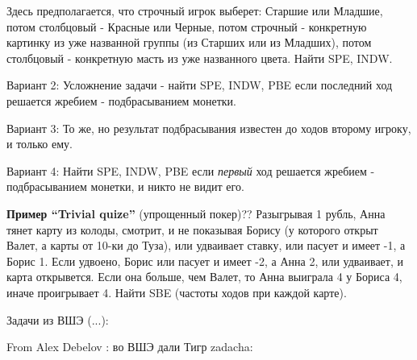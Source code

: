 \documentclass[a4paper,12pt]{article}
\begin{document}
Здесь предполагается, что строчный игрок выберет: Старшие
или Младшие, потом столбцовый - Красные или Черные, потом
строчный - конкретную картинку из уже названной группы (из
Старших или из Младших), потом столбцовый - конкретную
масть из уже названного цвета. Найти SPE, INDW.

Вариант 2: Усложнение задачи - найти SPE, INDW, PBE если
последний ход решается жребием - подбрасыванием монетки.

Вариант 3: То же, но результат подбрасывания известен до
ходов второму игроку, и только ему.

Вариант 4: Найти SPE, INDW, PBE если {\em первый} ход
решается жребием - подбрасыванием монетки, и никто не видит
его. \vspace{2mm}

{\bf Пример ``Trivial quize''} (упрощенный покер)?? Разыгрывая 1
рубль, Анна тянет карту из колоды, смотрит, и не показывая
Борису (у которого открыт Валет, а карты от 10-ки до Туза), или
удваивает ставку, или пасует и имеет -1, а Борис 1. Если
удвоено, Борис или пасует и имеет -2, а Анна 2, или удваивает, и
карта открывется. Если она больше, чем Валет, то Анна выиграла 4
у Бориса 4, иначе проигрывает 4. Найти SBE (частоты ходов при
каждой карте).

{\Large Задачи из ВШЭ} (...):

 From Alex
Debelov : во ВШЭ дали Тигр zadacha:
\end{document}
